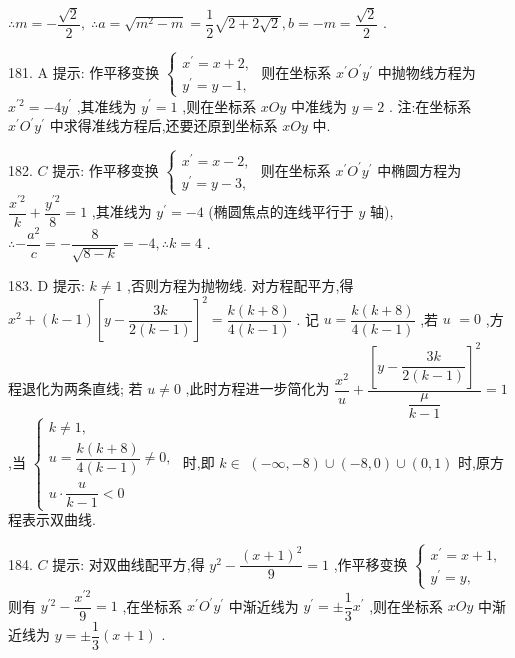 $\therefore m =  - \dfrac{\sqrt{2}}{2},\;\therefore a = \sqrt{{m}^{2} - m} = \dfrac{1}{2}\sqrt{2 + 2\sqrt{2}},b =  - m = \dfrac{\sqrt{2}}{2}$ .

181. A 提示: 作平移变换 $\left\{  \begin{array}{l} {x}^{\prime } = x + 2, \\  {y}^{\prime } = y - 1, \end{array}\right.$ 则在坐标系 ${x}^{\prime }{O}^{\prime }{y}^{\prime }$ 中抛物线方程为 ${x}^{\prime 2} =  - 4{y}^{\prime }$ ,其准线为 ${y}^{\prime } = 1$ ,则在坐标系 ${xOy}$ 中准线为 $y = 2$ . 注:在坐标系 ${x}^{\prime }{O}^{\prime }{y}^{\prime }$ 中求得准线方程后,还要还原到坐标系 ${xOy}$ 中.

182. $C$ 提示: 作平移变换 $\left\{  \begin{array}{l} {x}^{\prime } = x - 2, \\  {y}^{\prime } = y - 3, \end{array}\right.$ 则在坐标系 ${x}^{\prime }{O}^{\prime }{y}^{\prime }$ 中椭圆方程为 $\dfrac{{x}^{\prime 2}}{k} + \dfrac{{y}^{\prime 2}}{8} = 1$ ,其准线为 ${y}^{\prime } =  - 4$ (椭圆焦点的连线平行于 $y$ 轴), $\therefore  - \dfrac{{a}^{2}}{c} =  - \dfrac{8}{\sqrt{8 - k}} =  - 4,\therefore k = 4$ .

183. D 提示: $k \neq  1$ ,否则方程为抛物线. 对方程配平方,得 ${x}^{2} + \left( {k - 1}\right) {\left\lbrack  y - \dfrac{3k}{2\left( {k - 1}\right) }\right\rbrack  }^{2} = \dfrac{k\left( {k + 8}\right) }{4\left( {k - 1}\right) }$ . 记 $u = \dfrac{k\left( {k + 8}\right) }{4\left( {k - 1}\right) }$ ,若 $u$  $= 0$ ,方程退化为两条直线; 若 $u \neq  0$ ,此时方程进一步简化为 $\dfrac{{x}^{2}}{u} + \dfrac{{\left\lbrack  y - \dfrac{3k}{2\left( {k - 1}\right) }\right\rbrack  }^{2}}{\dfrac{\mu }{k - 1}} = 1$ ,当 $\left\{  \begin{array}{l} k \neq  1, \\  u = \dfrac{k\left( {k + 8}\right) }{4\left( {k - 1}\right) } \neq  0, \\  u \cdot  \dfrac{u}{k - 1} < 0 \end{array}\right.$ 时,即 $k \in$  $\left( {-\infty , - 8}\right)  \cup  \left( {-8,0}\right)  \cup  \left( {0,1}\right)$ 时,原方程表示双曲线.

184. $C$ 提示: 对双曲线配平方,得 ${y}^{2} - \dfrac{{\left( x + 1\right) }^{2}}{9} = 1$ ,作平移变换 $\left\{  \begin{array}{l} {x}^{\prime } = x + 1, \\  {y}^{\prime } = y, \end{array}\right.$ 则有 ${y}^{\prime 2} - \dfrac{{x}^{\prime 2}}{9} = 1$ ,在坐标系 ${x}^{\prime }{O}^{\prime }{y}^{\prime }$ 中渐近线为 ${y}^{\prime } =  \pm  \dfrac{1}{3}{x}^{\prime }$ ,则在坐标系 ${xOy}$ 中渐近线为 $y =  \pm  \dfrac{1}{3}\left( {x + 1}\right)$ .

